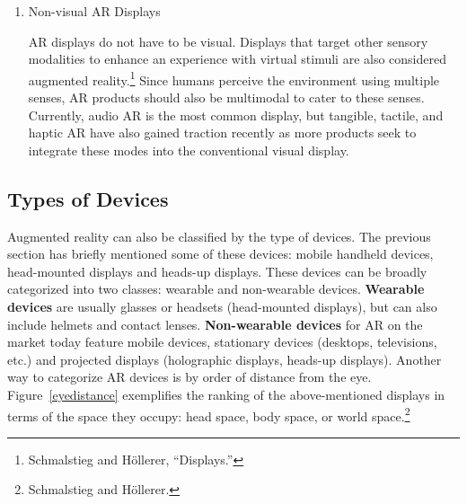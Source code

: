 \begin{enumerate}
\begin{figure}[!ht]
\end{figure}

\item Non-visual AR Displays

AR displays do not have to be visual. Displays that target other sensory modalities to enhance an experience with virtual stimuli are also considered augmented reality.\footnote{Schmalstieg and Höllerer, “Displays.”} Since humans perceive the environment using multiple senses, AR products should also be multimodal to cater to these senses. Currently, audio AR is the most common display, but tangible, tactile, and haptic AR have also gained traction recently as more products seek to integrate these modes into the conventional visual display.

\end{enumerate}

\subsection{Types of Devices}

\begin{figure}[!ht]
\end{figure}

Augmented reality can also be classified by the type of devices. The previous section has briefly mentioned some of these devices: mobile handheld devices, head-mounted displays and heads-up displays. These devices can be broadly categorized into two classes: wearable and non-wearable devices. \textbf{Wearable devices} are usually glasses or headsets (head-mounted displays), but can also include helmets and contact lenses. \textbf{Non-wearable devices} for AR on the market today feature mobile devices, stationary devices (desktops, televisions, etc.) and projected displays (holographic displays, heads-up displays). Another way to categorize AR devices is by order of distance from the eye. Figure~\ref{eyedistance} exemplifies the ranking of the above-mentioned displays in terms of the space they occupy: head space, body space, or world space.\footnote{Schmalstieg and Höllerer.}

